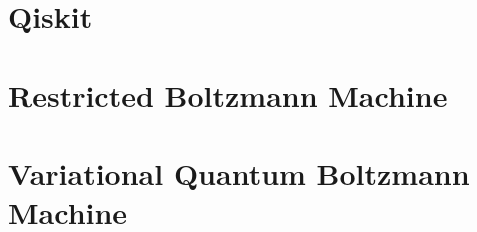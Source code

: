 \chapter{Qiskit}

\chapter{Restricted Boltzmann Machine}

\chapter{Variational Quantum Boltzmann Machine}

